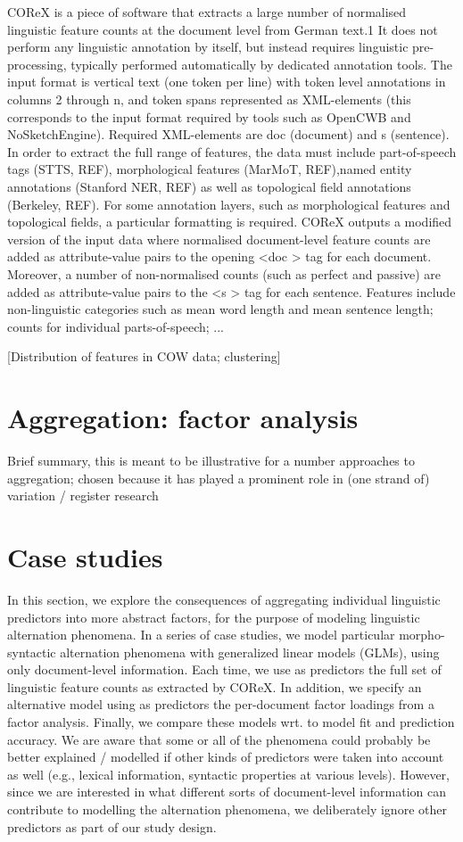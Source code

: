 \documentclass[11pt]{article}
\begin{document}
COReX is a piece of software that extracts a large number of normalised linguistic feature counts at the document level from German text.1 It does not perform any linguistic annotation by itself, but instead requires linguistic pre-processing, typically performed automatically by dedicated annotation tools. The input format is vertical text (one token per line) with token level annotations in columns 2 through n, and token spans represented as XML-elements (this corresponds to the input format required by tools such as OpenCWB and NoSketchEngine). Required XML-elements are doc (document) and s (sentence). In order to extract the full range of features, the data must include part-of-speech tags (STTS, REF), morphological features (MarMoT, REF),named entity annotations (Stanford NER, REF) as well as topological field annotations (Berkeley, REF). For some annotation layers, such as morphological features and topological fields, a particular formatting is required. COReX outputs a modified version of the input data where normalised document-level feature counts are added as attribute-value pairs to the opening <doc > tag for each document. Moreover, a number of non-normalised counts (such as perfect and passive) are added as attribute-value pairs to the <s > tag for each sentence. Features include non-linguistic categories such as mean word length and mean sentence length; counts for individual parts-of-speech; ...
 
[Distribution of features in COW data; clustering]

\section{Aggregation: factor analysis}

Brief summary, this is meant to be illustrative for a number approaches to aggregation; chosen because it has played a prominent role in (one strand of) variation / register research

\section{Case studies}
In this section, we explore the consequences of aggregating individual linguistic predictors into more abstract factors, for the purpose of modeling linguistic alternation phenomena. In a series of case studies, we model particular morpho-syntactic alternation phenomena with generalized linear models (GLMs), using only document-level information. Each time, we use as predictors the full set of linguistic feature counts as extracted by COReX. In addition, we specify an alternative model using as predictors the per-document factor loadings from a factor analysis. Finally, we compare these models wrt. to model fit and prediction accuracy. 
We are aware that some or all of the phenomena could probably be better explained / modelled if other kinds of predictors were taken into account as well (e.g., lexical information, syntactic properties at various levels). However, since we are interested in what different sorts of document-level information can contribute to modelling the alternation phenomena, we deliberately ignore other predictors as part of our study design.
\end{document}
